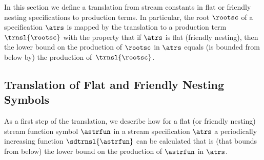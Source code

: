 %
%
In this section we define a translation 
from stream constants in flat
or friendly nesting specifications to production terms.
In particular, the root $\rootsc$ of a specification $\atrs$ 
is mapped by the translation to a production term $\trnsl{\rootsc}$ 
with the property that if\/ $\atrs$ is flat (friendly nesting), 
then the \daob{} lower bound on the production of $\rootsc$ in $\atrs$ 
equals (is bounded from below by) 
the production of~$\trnsl{\rootsc}$.

\subsection{Translation of Flat and Friendly Nesting Symbols}\label{sec:translation:subsec:functions}

%
% 


As a first step of the translation, 
we describe how for a flat (or friendly nesting) 
stream function symbol $\astrfun$ in a stream specification $\atrs$ 
a periodically increasing function $\sdtrnsl{\astrfun}$
can be calculated
that is (that bounds from below)
the \daob{} lower bound on the production of $\astrfun$
in $\atrs$. %
%
\pagebreak

